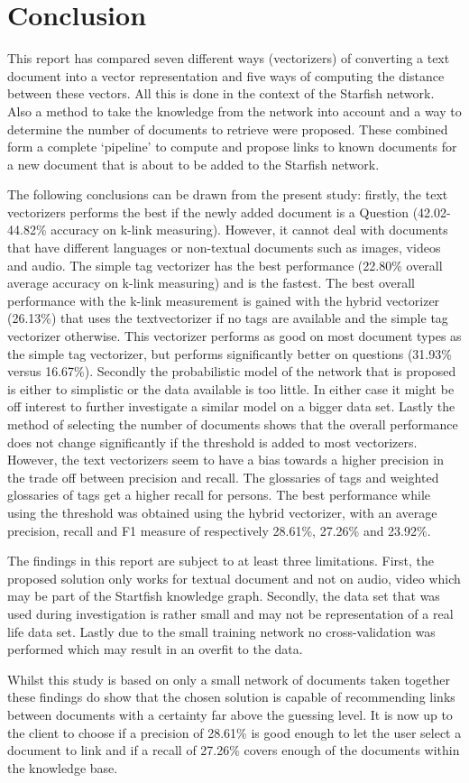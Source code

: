 \section{Conclusion}
This report has compared seven different ways (vectorizers) of converting a text
document into a vector representation and five ways of computing the distance
between these vectors. All this is done in the context of the Starfish network.
Also a method to take the knowledge from the network into account and a way to
determine the number of documents to retrieve were proposed. These combined
form a complete `pipeline' to compute and propose links to known documents for
a new document that is about to be added to the Starfish network.

The following conclusions can be drawn from the present study: firstly, the
text vectorizers performs the best if the newly added document is a Question (42.02-44.82\% accuracy on k-link measuring). However, it cannot deal with
documents that have different languages or non-textual documents such as images, videos
and audio. The simple tag vectorizer has the
best performance (22.80\% overall average accuracy on k-link measuring) and is the fastest. The best overall performance with the k-link measurement
is gained with the hybrid vectorizer (26.13\%) that uses the textvectorizer if no tags are
available and the simple tag vectorizer otherwise. This vectorizer performs as
good on most document types as the simple tag vectorizer, but performs significantly
better on questions (31.93\% versus 16.67\%). Secondly the probabilistic model of the network that is proposed 
is either to simplistic
or the data available is too little. In either case it might be off interest to
further investigate a similar model on a bigger data set. Lastly the method
of selecting the number of documents shows that the overall performance 
does not change significantly if the threshold is added to most vectorizers.
However, the text vectorizers seem to have a bias towards a higher precision in the
trade off between precision and recall. The
glossaries of tags and weighted glossaries of tags get a higher
recall for persons. The best performance while using the threshold was obtained
using the hybrid vectorizer, with an average precision, recall and F1 measure of respectively 28.61\%, 27.26\% and 23.92\%. 

The findings in this report are subject to at least three limitations. First,
the proposed solution only works for textual document and not on audio, video
which may be part of the Startfish knowledge graph. Secondly, the data set
that was used during investigation is rather small and may not be representation
of a real life data set. Lastly due to the small training network no cross-validation
was performed which may result in an overfit to the data.

Whilst this study is based on only a small network of documents taken together
these findings do show that the chosen solution is capable of recommending
links between documents with a certainty far above the guessing level. It is
now up to the client to choose if a precision of 28.61\%
is good enough to let the user select a document to link and if a recall of 27.26\%
covers enough of the documents within the knowledge base. 


